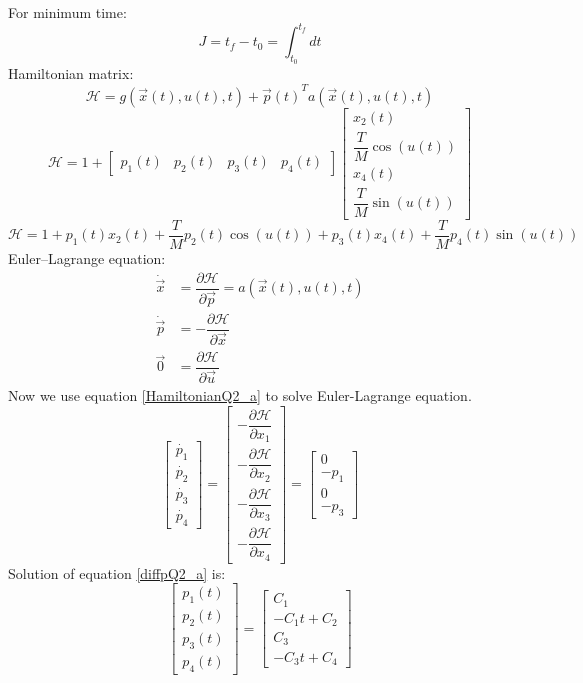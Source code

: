 For minimum time:
$$J = t_f - t_0 = \int_{t_0}^{t_f} dt$$
Hamiltonian matrix:
$$\mathcal{H} =  g(\vec x(t), u(t), t) + {\vec{p}(t)}^Ta(\vec x(t), u(t), t)$$
$$\mathcal{H} = 1 + \begin{bmatrix} 
	p_1(t) & p_2(t) & p_3(t) & p_4(t)
\end{bmatrix} \begin{bmatrix}
	x_2(t)\\
	\dfrac{T}{M} \cos(u(t))\\
	x_4(t)\\
	\dfrac{T}{M} \sin(u(t))
\end{bmatrix}$$
\begin{equation} \label{HamiltonianQ2_a}
	\mathcal{H} = 1 + p_1(t)x_2(t) + \dfrac{T}{M}p_2(t)\cos(u(t)) +p_3(t)x_4(t) +\dfrac{T}{M}p_4(t)\sin(u(t))
\end{equation}
Euler–Lagrange equation:
\begin{align}
	\dot{\vec{x}} &= \dfrac{\partial \mathcal{H} }{\partial \vec{p}} = a(\vec x(t), u(t), t)\\
	\dot{\vec{p}} &= -\dfrac{\partial \mathcal{H} }{\partial \vec{x}} \\
	{\vec{0}} &= \dfrac{\partial \mathcal{H} }{\partial \vec{u}}
\end{align}
Now  we use equation \ref{HamiltonianQ2_a} to solve Euler-Lagrange equation.
\begin{equation}\label{diffpQ2_a}
	\begin{bmatrix}
		\dot{p_1}\\
		\dot{p_2}\\
		\dot{p_3}\\
		\dot{p_4}
	\end{bmatrix} = \begin{bmatrix}
		-\dfrac{\partial \mathcal{H}}{\partial x_1} \\[10 pt]
		-\dfrac{\partial \mathcal{H}}{\partial x_2} \\[10 pt]
		-\dfrac{\partial \mathcal{H}}{\partial x_3} \\[10 pt]
		-\dfrac{\partial \mathcal{H}}{\partial x_4} 
	\end{bmatrix} = \begin{bmatrix}
		0 \\
		-p_1\\
		0\\
		-p_3
	\end{bmatrix}
\end{equation} 
Solution of equation \ref{diffpQ2_a} is:
\begin{equation}\label{SolvepQ2_a}
	\begin{bmatrix}
		p_1(t)\\
		p_2(t)\\
		p_3(t)\\
		p_4(t)
	\end{bmatrix} = \begin{bmatrix}
		C_1\\
		-C_1t+C_2\\
		C_3\\
		-C_3t+C_4
	\end{bmatrix} 
\end{equation}
